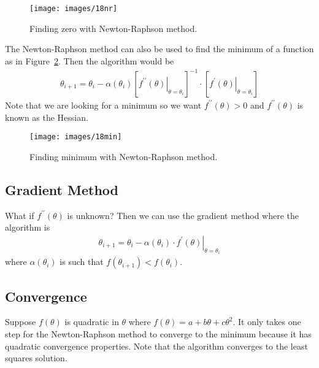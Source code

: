 \begin{figure}[ht!]
\centering
\texttt{[image: images/18nr]}
\caption{Finding zero with Newton-Raphson method.}
\label{fig:18nr}
\end{figure}

The Newton-Raphson method can also be used to find the minimum of a function as in Figure~\ref{fig:18min}.
Then the algorithm would be
\begin{align*}
\boxed{\theta_{i+1} = \theta_i - \alpha(\theta_i){\left[\left.f^{\prime\prime}(\theta)\right|_{\theta=\theta_i}\right]}^{-1}\cdot\left[\left.f^\prime(\theta)\right|_{\theta=\theta_i}\right]}
\end{align*}
Note that we are looking for a minimum so we want $f^{\prime\prime}(\theta)>0$ and $f^{\prime\prime}(\theta)$ is known as the Hessian.

\begin{figure}[ht!]
\centering
\texttt{[image: images/18min]}
\caption{Finding minimum with Newton-Raphson method.}
\label{fig:18min}
\end{figure}

\subsection{Gradient Method}
What if $f^{\prime\prime}(\theta)$ is unknown? Then we can use the gradient method where the algorithm is
\begin{align*}
\boxed{\theta_{i+1} = \theta_i - \alpha(\theta_i)\cdot \left.f^\prime(\theta)\right|_{\theta=\theta_i}}
\end{align*}
where $\alpha(\theta_i)$ is such that $f(\theta_{i+1})<f(\theta_i)$.

\subsection{Convergence}
Suppose $f(\theta)$ is quadratic in $\theta$ where $f(\theta)=a+b\theta+c\theta^2$.
It only takes one step for the Newton-Raphson method to converge to the minimum because it has quadratic convergence properties.
Note that the algorithm converges to the least squares solution.

